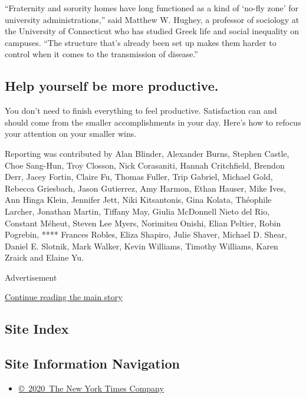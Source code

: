 ``Fraternity and sorority homes have long functioned as a kind of
`no-fly zone' for university administrations,'' said Matthew W. Hughey,
a professor of sociology at the University of Connecticut who has
studied Greek life and social inequality on campuses. ``The structure
that's already been set up makes them harder to control when it comes to
the transmission of disease.''

\hypertarget{help-yourself-be-more-productive}{%
\subsection{Help yourself be more
productive.}\label{help-yourself-be-more-productive}}

You don't need to finish everything to feel productive. Satisfaction can
and should come from the smaller accomplishments in your day. Here's how
to refocus your attention on your smaller wins.

Reporting was contributed by Alan Blinder, Alexander Burns, Stephen
Castle, Choe Sang-Hun, Troy Closson, Nick Corasaniti, Hannah
Critchfield, Brendon Derr, Jacey Fortin, Claire Fu, Thomas Fuller, Trip
Gabriel, Michael Gold, Rebecca Griesbach, Jason Gutierrez, Amy Harmon,
Ethan Hauser, Mike Ives, Ann Hinga Klein, Jennifer Jett, Niki
Kitsantonis, Gina Kolata, Théophile Larcher, Jonathan Martin, Tiffany
May, Giulia McDonnell Nieto del Rio, Constant Méheut, Steven Lee Myers,
Norimitsu Onishi, Elian Peltier, Robin Pogrebin, **** Frances Robles,
Eliza Shapiro, Julie Shaver, Michael D. Shear, Daniel E. Slotnik, Mark
Walker, Kevin Williams, Timothy Williams, Karen Zraick and Elaine Yu.

Advertisement

\protect\hyperlink{after-bottom}{Continue reading the main story}

\hypertarget{site-index}{%
\subsection{Site Index}\label{site-index}}

\hypertarget{site-information-navigation}{%
\subsection{Site Information
Navigation}\label{site-information-navigation}}

\begin{itemize}
\tightlist
\item
  \href{https://help.nytimes3xbfgragh.onion/hc/en-us/articles/115014792127-Copyright-notice}{©~2020~The
  New York Times Company}
\end{itemize}

